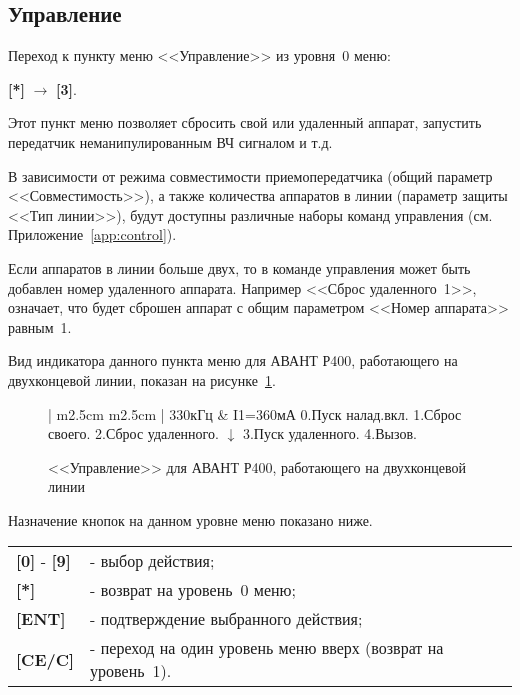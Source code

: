 \subsection{Управление}	\label{ssec:control}

Переход к пункту меню <<Управление>> из уровня~0 меню: 

\textbf{[*]} $\rightarrow$ \textbf{[3]}.

Этот пункт меню позволяет сбросить свой или удаленный аппарат, запустить передатчик неманипулированным ВЧ сигналом и т.д. 

В зависимости от режима совместимости приемопередатчика (общий параметр <<Совместимость>>), а также количества аппаратов в линии (параметр защиты <<Тип линии>>), будут доступны различные наборы команд управления (см. Приложение~\ref{app:control}). 

Если аппаратов в линии больше двух, то в команде управления может быть добавлен номер удаленного аппарата. Например <<Сброс удаленного~1>>, означает, что будет сброшен аппарат с общим параметром <<Номер аппарата>> равным~1.

Вид индикатора данного пункта меню для АВАНТ Р400, работающего на двухконцевой линии, показан на рисунке~\ref{fig:control}. 

\begin{figure}[H]
	\centering
	
	\begin{tabular}{| m{2.5cm}  m{2.5cm} |}
		\firsthline
		330кГц	& \raggedleft I1=360мА				\tabularnewline 
		 {0.Пуск налад.вкл.}	\tabularnewline 
		 {1.Сброс своего. }		\tabularnewline 
		 {2.Сброс удаленного.} 	\tabularnewline \hline
		 {$\downarrow$}			\tabularnewline
		 {3.Пуск удаленного.} 	\tabularnewline 
		 {4.Вызов.}				\tabularnewline 
		\lasthline
	\end{tabular} 
	
	\caption{<<Управление>> для АВАНТ Р400, работающего на двухконцевой линии}
	\label{fig:control}
\end{figure}

Назначение кнопок на данном уровне меню показано ниже.
\begin{center}
	\begin{tabular}{p{2cm} p{15cm}}
		\textbf{[0]} - \textbf{[9]} & - выбор действия; \tabularnewline 
		\textbf{[*]} 	& - возврат на уровень~0 меню; \tabularnewline
		\textbf{[ENT]} 	& - подтверждение выбранного действия; \tabularnewline
		\textbf{[CE/C]} & - переход на один уровень меню вверх (возврат на уровень~1). \tabularnewline				
	\end{tabular} 
\end{center}
